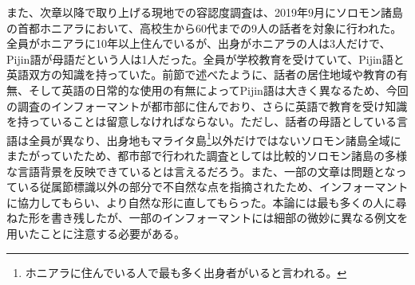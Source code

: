また、次章以降で取り上げる現地での容認度調査は、2019年9月にソロモン諸島の首都ホニアラにおいて、高校生から60代までの9人の話者を対象に行われた。全員がホニアラに10年以上住んでいるが、出身がホニアラの人は3人だけで、Pijin語が母語だという人は1人だった。全員が学校教育を受けていて、Pijin語と英語双方の知識を持っていた。前節で述べたように、話者の居住地域や教育の有無、そして英語の日常的な使用の有無によってPijin語は大きく異なるため、今回の調査のインフォーマントが都市部に住んでおり、さらに英語で教育を受け知識を持っていることは留意しなければならない。ただし、話者の母語としている言語は全員が異なり、出身地もマライタ島\footnote{ホニアラに住んでいる人で最も多く出身者がいると言われる。}以外だけではないソロモン諸島全域にまたがっていたため、都市部で行われた調査としては比較的ソロモン諸島の多様な言語背景を反映できているとは言えるだろう。また、一部の文章は問題となっている従属節標識以外の部分で不自然な点を指摘されたため、インフォーマントに協力してもらい、より自然な形に直してもらった。本論には最も多くの人に尋ねた形を書き残したが、一部のインフォーマントには細部の微妙に異なる例文を用いたことに注意する必要がある。
